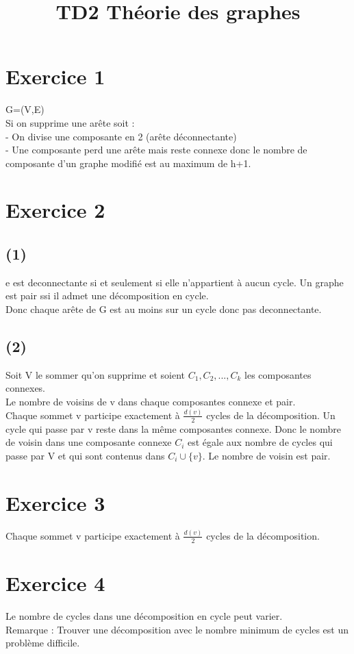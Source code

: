 \documentclass{article}
\title{TD2 Théorie des graphes}
\author{}
\date{}
\begin{document}
\maketitle{}
\section*{Exercice 1}
G=(V,E) \\
Si on supprime une arête soit : \\
- On divise une composante en 2 (arête déconnectante) \\
- Une composante perd une arête mais reste connexe donc le nombre de composante d'un graphe modifié est au maximum de h+1.

\section*{Exercice 2}
\subsection*{(1)}
e est deconnectante si et seulement si elle n'appartient à aucun cycle. Un graphe est pair ssi il admet une décomposition en cycle. \\
Donc chaque arête de G est au moins sur un cycle donc pas deconnectante.
\subsection*{(2)}
Soit V le sommer qu'on supprime et soient $C_1,C_2,...,C_{k}$ les composantes connexes. \\
Le nombre de voisins de v dans chaque composantes connexe et pair. \\
Chaque sommet v participe exactement à $\frac{d(v)}{2}$ cycles de la décomposition. Un cycle qui passe par v reste dans la même composantes connexe. Donc le nombre de voisin dans une composante connexe $C_i$ est égale aux nombre de cycles qui passe par V et qui sont contenus dans $C_i \cup \{v\}$. Le nombre de voisin est pair. 

\section*{Exercice 3}
Chaque sommet v participe exactement à $\frac{d(v)}{2}$ cycles de la décomposition.

\section*{Exercice 4}
Le nombre de cycles dans une décomposition en cycle peut varier. \\
Remarque : Trouver une décomposition avec le nombre minimum de cycles est un problème difficile. \\
\end{document}
